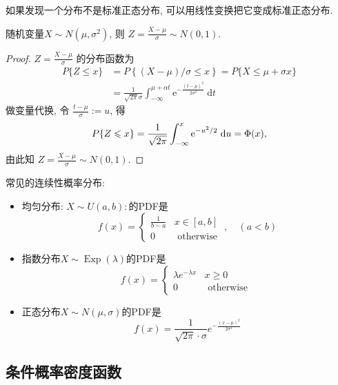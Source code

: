 如果发现一个分布不是标准正态分布, 可以用线性变换把它变成标准正态分布.

\begin{proposition}
    随机变量$X\sim N(\mu,\sigma^2)$, 则 $Z=\frac{X-\mu}{\sigma}\sim N(0,1)$.
\end{proposition}


\begin{proof}
    { $Z=\frac{X-\mu}{\sigma}$ 的分布函数为$$
            \begin{aligned}
                P\{Z \leqslant x\} & =P\left\{{(X-\mu)}/{\sigma} \leqslant x\right\}=P\{X \leqslant \mu+\sigma x\}                                         \\
                                   & =\frac{1}{\sqrt{2 \pi} \sigma} \int_{-\infty}^{\mu+\alpha t} \mathrm{e}^{-\frac{(t-\mu)^2}{2 \sigma^2}} \mathrm{~d} t
            \end{aligned}
        $$
        做变量代换, 令 $\frac{t-\mu}{\sigma}:=u$, 得$$
            \small P\{Z \leqslant x\}=\frac{1}{\sqrt{2 \pi}} \int_{-\infty}^x \mathrm{e}^{-u^2 / 2} \mathrm{~d} u=\Phi(x),
        $$
        由此知 $Z=\frac{X-\mu}{\sigma} \sim N(0,1)$.}
\end{proof}

\begin{takeaway}
    常见的连续性概率分布: 
    \begin{itemize}
        \item 均匀分布: $X\sim U(a, b): $的PDF是$$
        f(x)=\left\{\begin{array}{ll}
        \frac{1}{b-a} & x \in[a, b] \\
        0 & \text { otherwise }
        \end{array}, \quad(a<b)\right.
        $$
        \item 指数分布${X} \sim \operatorname{Exp}(\lambda)$的PDF是$$
        f(x)= \begin{cases}\lambda e^{-\lambda x} & x \geq 0 \\ 0 & \text { otherwise }\end{cases}
        $$
        \item 正态分布$X\sim N(\mu,\sigma)$的PDF是$$
        f(x)=\frac{1}{\sqrt{2 \pi} \cdot \sigma} e^{-\frac{(x-\mu)^2}{2 \sigma^2}}
        $$
    \end{itemize}
\end{takeaway}

\subsection{条件概率密度函数}

